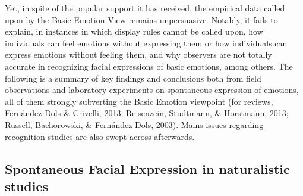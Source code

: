 \documentclass[man]{apa6}
\begin{document}
Yet, in spite of the popular support it has received, the empirical data called upon by the Basic Emotion View remains unpersuasive. Notably, it fails to explain, in instances in which display rules cannot be called upon, how individuals can feel emotions without expressing them or how individuals can express emotions without feeling them, and why observers are not totally accurate in recognizing facial expressions of basic emotions, among others. The following is a summary of key findings and conclusions both from field observations and laboratory experiments on spontaneous expression of emotions, all of them strongly subverting the Basic Emotion viewpoint (for reviews, Fernández-Dols \& Crivelli, 2013; Reisenzein, Studtmann, \& Horstmann, 2013; Russell, Bachorowski, \& Fernández-Dols, 2003). Mains issues regarding recognition studies are also swept across afterwards.

\hypertarget{spontaneous-facial-expression-in-naturalistic-studies}{%
\subsection{Spontaneous Facial Expression in naturalistic studies}\label{spontaneous-facial-expression-in-naturalistic-studies}}
\end{document}
